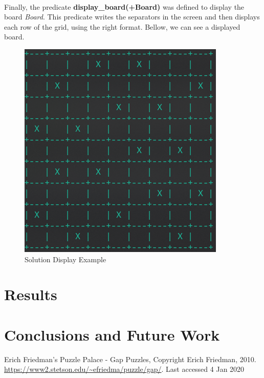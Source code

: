 \documentclass[runningheads]{llncs}
\begin{document}
\paragraph{}
Finally, the predicate \textbf{display\_board(+Board)} was defined to display the board \textit{Board}. This predicate
writes the separators in the screen and then displays each row of the grid, using the right format. Bellow, we can see a
displayed board.
    
\begin{figure}
    \begin{center}
        \includegraphics[scale=0.5]{images/fig2.png}
        \caption{Solution Display Example} \label{fig2}
    \end{center}
\end{figure}
    

\section{Results}


\section{Conclusions and Future Work}


\begin{thebibliography}{8}
    Erich Friedman's Puzzle Palace - Gap Puzzles, Copyright Erich Friedman, 2010. 
    \url{https://www2.stetson.edu/~efriedma/puzzle/gap/}. 
    Last accessed 4 Jan 2020
    \end{thebibliography}
\end{document}
